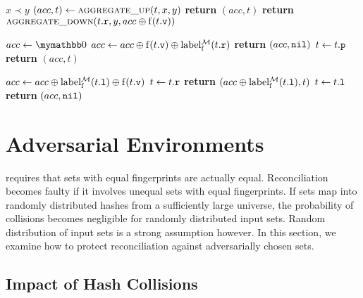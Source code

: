 \documentclass[conference]{IEEEtran}
\newcommand{\return}[0]{\textbf{return }}
\begin{document}
\begin{algorithm}
\caption{}\label{alg:aggregate_ascending}
\begin{algorithmic}[1]
\Require $x \prec y$
	\State $(acc, t) \gets \Call{aggregate\_up}{t, x, y}$
		\State \return $(acc, t)$
	\Else
		\State \return $\Call{aggregate\_down}{\tr{t}, y, acc \groupaddsym \f(\tv{t})}$
	\EndIf
\EndProcedure

	\State $acc \gets \neutraladd$
			\State $acc \gets acc \oplus \operatorname{f}({t}\mathtt{.v}) \oplus \operatorname{label_{\operatorname{f}}^{\mathcal{M}}}({t}\mathtt{.r})$
		\EndIf
			\State \return $(acc, \mathtt{nil})$
		\Else
			\State $t \gets {t}\mathtt{.p}$
		\EndIf
	\EndWhile
	\State \return $(acc, t)$
\EndProcedure

			\State $acc \gets acc \oplus \operatorname{label_{\operatorname{f}}^{\mathcal{M}}}({t}\mathtt{.l}) \oplus \operatorname{f}({t}\mathtt{.v})$
			\State $t \gets {t}\mathtt{.r}$
			\State \return $(acc \oplus \operatorname{label_{\operatorname{f}}^{\mathcal{M}}}({t}\mathtt{.l}), t)$
		\Else
			\State $t \gets {t}\mathtt{.l}$
		\EndIf
	\EndWhile
	\State \return $(acc, \mathtt{nil})$
\EndProcedure
\end{algorithmic}
\end{algorithm}




\section{Adversarial Environments}\label{secure}

 requires that sets with equal fingerprints are actually equal. Reconciliation becomes faulty if it involves unequal sets with equal fingerprints. If sets map into randomly distributed hashes from a sufficiently large universe, the probability of collisions becomes negligible for randomly distributed input sets. Random distribution of input sets is a strong assumption however. In this section, we examine how to protect reconciliation against adversarially chosen sets.

\subsection{Impact of Hash Collisions}
\end{document}

